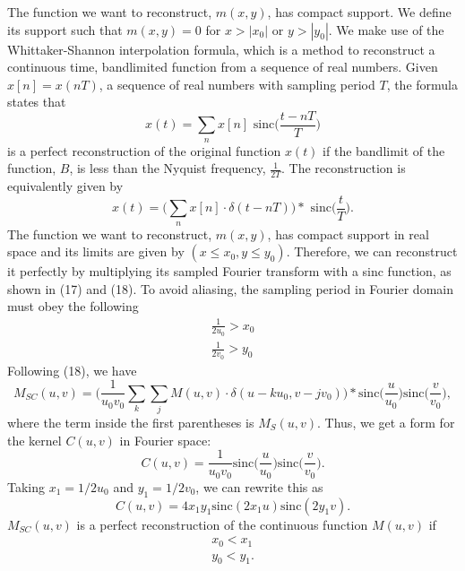 The function we want to reconstruct, $m(x,y)$, has compact support. We define its support such that $m(x,y) = 0$ for $x>|x_0|$ or $y>|y_0|$. We make use of the Whittaker-Shannon interpolation formula, which is a method to reconstruct a continuous time, bandlimited function from a sequence of real numbers. Given $x[n] = x(nT)$, a sequence of real numbers with sampling period $T$, the formula states that 
\begin{equation}
x(t) = \sum_n x[n] \text{ sinc}\Bigg( \frac{t-nT}{T}\Bigg)
\end{equation}
is a perfect reconstruction of the original function $x(t)$ if the bandlimit of the function, $B$, is less than the Nyquist frequency, $\frac{1}{2T}$. The reconstruction is equivalently given by 
\begin{equation}
x(t) = \Bigg(\sum_n x[n] \cdot \delta(t-nT)\Bigg) \ast \text{ sinc}\Bigg( \frac{t}{T}\Bigg).
\end{equation}
The function we want to reconstruct, $m(x,y)$, has compact support in real space and its limits are given by $(x \leq x_0, y \leq y_0)$. Therefore, we can reconstruct it perfectly by multiplying its sampled Fourier transform with a sinc function, as shown in (17) and (18). To avoid aliasing, the sampling period in Fourier domain must obey the following
\begin{align}
\frac{1}{2u_0} > x_0 \\
\frac{1}{2v_0} > y_0
\end{align}
Following (18), we have
\begin{equation}
M_{SC}(u,v) =\Bigg( \frac{1}{u_0v_0} \sum_k \sum_j M(u,v) \cdot \delta(u-ku_0, v-jv_0)\Bigg) \ast \text{sinc}\Bigg(\frac{u}{u_0}\Bigg)\text{sinc}\Bigg(\frac{v}{v_0}\Bigg),
\end{equation}
where the term inside the first parentheses is $M_{S}(u,v)$. Thus, we get a form for the kernel $C(u,v)$ in Fourier space:
\begin{equation}
C(u,v) = \frac{1}{u_0v_0}\text{sinc}\Bigg(\frac{u}{u_0}\Bigg)\text{sinc}\Bigg(\frac{v}{v_0}\Bigg).
\end{equation}
Taking $x_1 = 1/2u_0$ and $y_1 = 1/2v_0$, we can rewrite this as
\begin{equation}
C(u,v) = 4x_1 y_1 \text{sinc}(2x_1 u) \text{sinc}(2y_1 v).
\end{equation}
$M_{SC}(u,v)$ is a perfect reconstruction of the continuous function $M(u,v)$ if
\begin{align}
x_0 < x_1 \\
y_0 < y_1.
\end{align}
